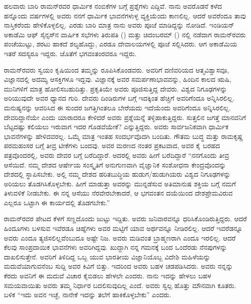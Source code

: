 
ಹಲವಾರು ಬಾರಿ ರಾಮನ್‍ರವರ ಧಾರ್ಮಿಕ ನಂಬಿಕೆಗಳ ಬಗ್ಗೆ ಪ್ರಶ್ನೆಗಳು ಎದ್ದಿವೆ. ನಾನು ಅವರೊಡನೆ ಕಳೆದ ಹನ್ನೊಂದು ವರ್ಷಗಳಲ್ಲಿ ಅವರು ನನಗೆ ಧಾರ್ಮಿಕ ಭಾವನೆಗಳುಳ್ಳ ವ್ಯಕ್ತಿಯೆಂದು ಕಾಣಲಿಲ್ಲ. ಆದರೆ ಅವರೆಂದೂ ತಾವು ನಾಸ್ತಿಕರೆಂದು ಹೇಳಿಕೊಳ್ಳಲಿಲ್ಲ. ಎರಡು ಬಾರಿ ಮಾತ್ರ ನಾನು ಅವರು ಪೂಜೆ ಮಾಡಿದ್ದನ್ನು ನೋಡಿದೆ. ಇಂಡಿಯನ್ ಅಕಾಡೆಮಿ ಆಫ್ ಸೈನ್ಸಸ್‍ನ ವಾರ್ಷಿಕ ಸಭೆಗಳು ತಿರುಪತಿ () ಮತ್ತು ಚಿದಂಬರಮ್ () ನಲ್ಲಿ ನಡೆದಾಗ ರಾಮನ್‍ರವರು ಪಂಚೆಯುಟ್ಟು, ಶರಟು ಹಾಕದೆ ಶಲ್ಯಹೊದ್ದು, ಎರಡೂ ದೇವಾಲಯಗಳಲ್ಲಿ ಪೂಜೆ ಸಲ್ಲಿಸಿದರು. ಆಗ ಅಕಾಡೆಮಿಯ ಇತರೆ ಸದಸ್ಯರೂ ಇದ್ದರು. ಜೊತೆಗೆ ಭಗವಂತಂರವರೂ ಇದ್ದರು.

ರಾಮನ್‍ರವರು ಸ್ವಯಂ ಕೃಷಿಯಿಂದ ತಮ್ಮನ್ನು ರೂಪಿಸಿಕೊಂಡವರು. ಅವರಿಗೆ ದಣಿವರಿಯದ ಆತ್ಮವಿಶ್ವಾಸವೂ, ವಿಜ್ಞಾನದಲ್ಲಿ ಅದಮ್ಯ ಆಸಕ್ತಿಗಳೂ ಇದ್ದವು. ವಿಜ್ಞಾನಕ್ಕೆ ಅವರ ಸಮರ್ಪಣಾಭಾವವನ್ನು, ಹಿಂದಿನ ಕಾಲದ ಋಷಿ, ಮುನಿಗಳಿಗೆ ಮಾತ್ರ ಹೋಲಿಸಬಹುದಿತ್ತು. ಪ್ರಕೃತಿಯೇ ಅವರು ಪೂಜಿಸುತ್ತಿದ್ದ ದೇವರು. ವಿಶ್ವದ ನಿಗೂಢಗಳನ್ನು ಅರಿಯುವುದೇ ಅವರ ಧ್ಯಾನದ ಗುರಿ. ದೇವರು ದಿಂಡಿರುಗಳ ಬಗ್ಗೆ ಇದಕ್ಕಿಂತ ಹೆಚ್ಚಿಗೆ ಅವರಿಗೆಂದೂ ಅನ್ನಿಸಿರಲಿಲ್ಲ. ಮನುಷ್ಯನನ್ನು ಆವರಿಸಿದ ಈ ಸುಂದರ ಜಗತ್ತಿಗಿಂತಲೂ ಬೇರೆಯದು ಇದೆಯೆಂದು ಅವರಿಗೆಂದೂ ಅನ್ನಿಸಿರಲಿಲ್ಲ. ದೇವರಿದ್ದಾನೆಯೇ ಎಂದು ಯಾರಾದರೂ ಕೇಳಿದರೆ ಅವರು ಪ್ರಶ್ನೆಯನ್ನೆ ತಳ್ಳಿಹಾಕುತ್ತಿದ್ದರು. ಸುತ್ತಲಿನ ಜಗತ್ತೆ ಮಾನವನಿಗೆ ಬೆಟ್ಟದಷ್ಟು ಕಲಿಯಲು ಇರುವಾಗ ಇದರ ಗೊಡವೆಯೇಕೆ? ಎನ್ನುತ್ತಿದ್ದರು. ಅವರು ಸಾರ್ವಜನಿಕವಾಗಿ ಧಾರ್ಮಿಕ ಭಾವನೆಗಳನ್ನು ಹೇಳಿದವರಲ್ಲ. ಒಮ್ಮೆ ಮಾತ್ರ ಇಂತಹ ಸಂದರ್ಭವೊದಗಿ ಬಂದಿತು. ಗೌತಮ ಬುದ್ಧ ಮತ್ತು ರಾಮಕೃಷ್ಣ ಪರಮಹಂಸರ ಬಗ್ಗೆ ತೀವ್ರ ಟೀಕೆಗಳು ಬಂದವು. ಅವರ ಮರಣದ ನಂತರ ಪ್ರಕಟವಾದ, ಅವರ ಕೈ ಬರಹದ ಪತ್ರವೊಂದರಲ್ಲಿ, ಅವರು ದೇವರ ಬಗ್ಗೆ ಬರೆದಿದ್ದಾರೆ. ಅದರಲ್ಲಿ ಅವರು ಹೀಗೆ ಬರೆದಿದ್ದಾರೆ\enginline{-} “ನನಗೊಂದು ತೀವ್ರ ಆಸೆಯಿದೆ. ನಮ್ಮ ದೇಶದ ಆರ್ಷೇಯ ಸಂಸ್ಕೃತಿಗೆ ಅನುಗುಣವಾಗಿ ವೈಜ್ಞಾನಿಕ ಸಂಶೋಧನಾ ಕೇಂದ್ರವೊಂದನ್ನು ದೇಶದಲ್ಲಿ ಸ್ಥಾಪಿಸಬೇಕು. ಅಲ್ಲಿ ನಮ್ಮ ದೇಶದ ಹರಿತಬುದ್ಧಿಯ ಹುಡುಗ/ಹುಡುಗಿಯರು ವಿಶ್ವದ ನಿಗೂಢಗಳನ್ನು ಅರಿಯಲು ತೊಡಗಿಸಿಕೊಳ್ಳಬೇಕು. ಹೀಗೆ ಮಾಡುತ್ತಾ ಅವರನ್ನು ಮುನ್ನಡೆಸುವ ಅತಿಮಾನುಷ ಶಕ್ತಿಯ ಬಗ್ಗೆ ನಮಗೆ ತಿಳುವಳಿಕೆ ನೀಡಬೇಕು. ಈ ನನ್ನ ಆಸೆಯು ನೆರವೇರಬೇಕಾದರೆ, ಆ ಭಗವಂತನ ದಯೆಯಿಂದ ದೇಶಪ್ರೇಮವಿರುವ ಎಲ್ಲರೂ ಒಟ್ಟಾಗಿ ಈ ಕಾರ್ಯದಲ್ಲಿ ತೊಡಗಬೇಕು.”

ರಾಮನ್‍ರವರ ಪೇಟದ ಕೆಳಗೆ ಸಣ್ಣದೊಂದು ಜುಟ್ಟು ಇದ್ದಿತು. ಅವರು ಜನಿವಾರವನ್ನೂ ಧರಿಸಿಕೊಂಡಿರುತ್ತಿದ್ದರು. ಆದರೆ ಹಿಂದೂಗಳು ಬಳಸುವ ಇವೆರಡೂ ಚಿಹ್ನೆಗಳು ಅವರ ಮಟ್ಟಿಗೆ ಯಾವ ಅರ್ಥವನ್ನೂ ನೀಡಿರಲಿಲ್ಲ. ಆದರೆ ಇವರೆಡನ್ನೂ ಅವರು ಎಂದೂ ತ್ಯಜಿಸಲಿಲ್ಲವೆಂಬುದೂ ಅಷ್ಟೇ ನಿಜ. ಅವರು ಮಡಿವಂತ ಬ್ರಾಹ್ಮಣರಾಗಿ ಎಂದೂ ಇರಲಿಲ್ಲ. ಆದರೆ ಕೆಲವು ಸಾಂಪ್ರದಾಯಿಕ ಭಾವನೆಗಳು ಅವರಿಗಿದ್ದವು. ಖುದ್ದಾಗಿ ನನ್ನ ಗಮನಕ್ಕೆ ಬಂದ ಒಂದೆರಡು ನೆನಪುಗಳನ್ನು ದಾಖಲಿಸುತ್ತೇನೆ. ಅವರಿಗೆ ತಿಳಿದಿದ್ದ ಒಬ್ಬ ಯುವ ಭಾರತೀಯ ವಿಜ್ಞಾನಿಯೊಬ್ಬ ವಿದೇಶಿ ಮಹಿಳೆಯನ್ನು ಮದುವೆಯಾಗುವನೆಂಬ ಸುದ್ದಿ ಅವರ ಕಿವಿಗೆ ಬಿತ್ತು. ಇದರಿಂದ ಅವರು ಬಹಳ ಚಡಪಡಿಸಿದರು. ಅವರು ನನ್ನನ್ನು ಕೆರದು ಅವನಿಗೆ ಈ ಮದುವೆ ವಿಚಾರ ಕೈಬಿಡಲು ಹೇಳಲೇ ಎಂದರು. ನಾನು ಇದನ್ನು ಹೇಳಲು ಬಹಳ ಸಮಯವಾಯಿತು ಅವರು ತಮ್ಮ ನಿರ್ಧಾರ ಬದಲಿಸುವುದಿಲ್ಲ ಎಂದೆ. ಅವರು ಸ್ವಲ್ಪ ಹೊತ್ತು ಮೌನವಾಗಿ ಕೂತರು. ಬಳಿಕ “ಇದು ಅವನ ಇಚ್ಛೆ, ನಾನೇಕೆ ಇದನ್ನು ತಲೆಗೆ ಹಾಕಿಕೊಳ್ಳಬೇಕು” ಎಂದರು.

